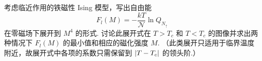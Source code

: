\documentclass{assignment}
\begin{document}
\begin{prob}
    考虑临近作用的铁磁性 Ising 模型，写出自由能
    \[
        F_l(M)=-\frac{kT}{\mathcal{N}}\ln Q_{N_{\uparrow}}
    \]
    在零磁场下展开到 $M^4$ 的形式. 讨论此展开式在 $T>T_c$ 和 $T<T_c$ 的图像并求出两种情况下 $F_l(M)$ 的最小值和相应的磁化强度 $M$. （此类展开只适用于临界温度附近，故展开式中各项的系数只需保留到 $\left\lvert T-T_c\right\rvert$ 的领头阶.）
\end{prob}
\begin{sol}
    
\end{sol}
\end{document}
